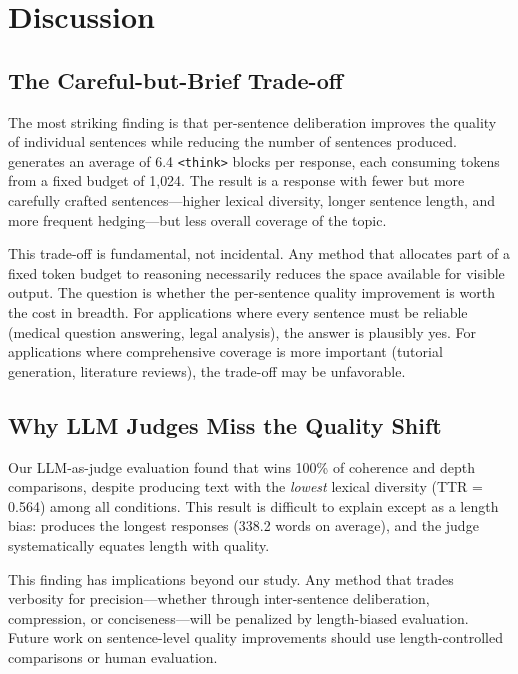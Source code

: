 \section{Discussion}
\label{sec:discussion}

\subsection{The Careful-but-Brief Trade-off}
\label{sec:tradeoff}

The most striking finding is that per-sentence deliberation improves the quality of individual sentences while reducing the number of sentences produced.
\iscotshort generates an average of 6.4 \texttt{<think>} blocks per response, each consuming tokens from a fixed budget of 1{,}024.
The result is a response with fewer but more carefully crafted sentences---higher lexical diversity, longer sentence length, and more frequent hedging---but less overall coverage of the topic.

This trade-off is fundamental, not incidental.
Any method that allocates part of a fixed token budget to reasoning necessarily reduces the space available for visible output.
The question is whether the per-sentence quality improvement is worth the cost in breadth.
For applications where every sentence must be reliable (\eg medical question answering, legal analysis), the answer is plausibly yes.
For applications where comprehensive coverage is more important (\eg tutorial generation, literature reviews), the trade-off may be unfavorable.

\subsection{Why LLM Judges Miss the Quality Shift}
\label{sec:judge_bias}

Our LLM-as-judge evaluation found that \standardcot wins 100\% of coherence and depth comparisons, despite producing text with the \emph{lowest} lexical diversity (TTR = 0.564) among all conditions.
This result is difficult to explain except as a length bias: \standardcot produces the longest responses (338.2 words on average), and the judge systematically equates length with quality.

This finding has implications beyond our study.
Any method that trades verbosity for precision---whether through inter-sentence deliberation, compression, or conciseness---will be penalized by length-biased evaluation.
Future work on sentence-level quality improvements should use length-controlled comparisons or human evaluation.

